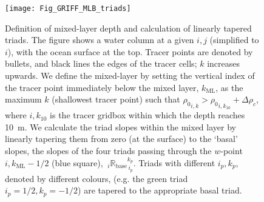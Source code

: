 \documentclass[../tex_main/NEMO_manual]{subfiles}
\begin{document}
\begin{figure}[h]
    \caption{\protect\label{fig:MLB_triad} Definition of
      mixed-layer depth and calculation of linearly tapered
      triads. The figure shows a water column at a given $i,j$
      (simplified to $i$), with the ocean surface at the top. Tracer points are denoted by
      bullets, and black lines the edges of the tracer cells; $k$
      increases upwards. \newline
      \hspace{5 em}We define the mixed-layer by setting the vertical index
      of the tracer point immediately below the mixed layer,
      $k_{\mathrm{ML}}$, as the maximum $k$ (shallowest tracer point)
      such that ${\rho_0}_{i,k}>{\rho_0}_{i,k_{10}}+\Delta\rho_c$,
      where $i,k_{10}$ is the tracer gridbox within which the depth
      reaches 10~m. We calculate the triad slopes within the mixed
      layer by linearly tapering them from zero (at the surface) to
      the `basal' slopes, the slopes of the four triads passing through the
      $w$-point $i,k_{\mathrm{ML}}-1/2$ (blue square),
      ${\:}_i{\mathbb{R}_{\mathrm{base}}}_{\,i_p}^{k_p}$. Triads with
    different $i_p,k_p$, denoted by different colours, (e.g. the green
    triad $i_p=1/2,k_p=-1/2$) are tapered to the appropriate basal triad.}
  {\texttt{[image: Fig\_GRIFF\_MLB\_triads]}}
\end{figure}
\end{document}
